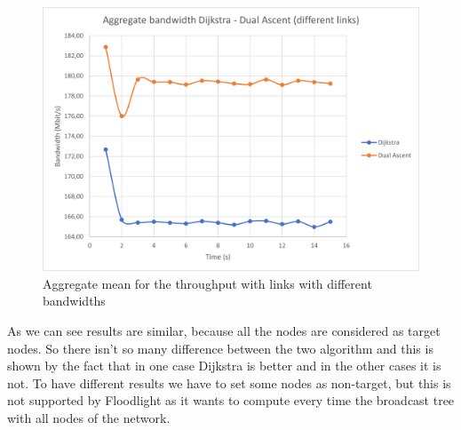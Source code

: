 \begin{figure}
	\centering
	\includegraphics[width=\textwidth]{img/aggregate-band-div.png}
	\caption{Aggregate mean for the throughput with links with different
	bandwidths}\label{fig:band-aggregate-div}
\end{figure}

As we can see results are similar, because all the nodes are considered as
target nodes. So there isn't so many difference between the two algorithm and
this is shown by the fact that in one case Dijkstra is better and in the other
cases it is not. To have different results we have to set some nodes as
non-target, but this is not supported by Floodlight as it wants to compute every
time the broadcast tree with all nodes of the network.
